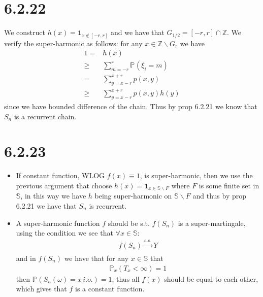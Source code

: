\documentclass[11pt,a4paper]{ctexart}
\numberwithin{equation}{section}%
\begin{document}
\section{6.2.22}



We construct $ h(x)=\mathbf{1}_{x\not\in [-r,r]} $ and we have that $ G_{1/2} = [-r,r]\cap \mathbb{Z} $. We verify the super-harmonic as follows: for any $ x\in \mathbb{Z}\backslash G_r $ we have
\begin{align*}
    1=& h(x)\\
    \geq& \sum_{m=-r}^{r}\mathbb{P}_{  }\left( \xi _i = m \right) \\
    =&\sum_{y=x-r}^{x+r}p(x,y)\\
    \geq& \sum_{y=x-r}^{x+r}p(x,y)h(y)
\end{align*}
since we have bounded difference of the chain. Thus by prop 6.2.21 we know that $ S_n $ is a recurrent chain.



\section{6.2.23}


\begin{itemize}[topsep=2pt,itemsep=0pt]
    \item If constant function, WLOG $ f(x)\equiv 1 $, is super-harmonic, then we use the previous argument that choose $ h(x)=\mathbf{1}_{x\in \mathbb{S}\backslash F} $ where $ F $ is some finite set in $ \mathbb{S} $, in this way we have $ h $ being super-harmonic on $ \mathbb{S}\backslash F $ and thus by prop 6.2.21 we have that $ S_n $ is recurrent.
    \item A super-harmonic function $ f $ should be s.t. $ f(S_n) $ is a super-martingale, using the condition we see that $ \forall x\in \mathbb{S} $:
    \begin{align*}
        f(S_n)\xrightarrow[]{\mathrm{a.s.}} Y 
    \end{align*}
    and in $ f(S_n)$ we have that for any $ x\in \mathbb{S} $ that
    \begin{align*}
        \mathbb{P}_{ x }\left( T_x<\infty \right) = 1 
    \end{align*}
    then $ \mathbb{P}_{  }\left( S_n(\omega ) = x \,i.o. \right) = 1  $, thus all $ f(x) $ should be equal to each other, which gives that $ f $ is a constant function.
\end{itemize}

    













    

    
\end{document}
